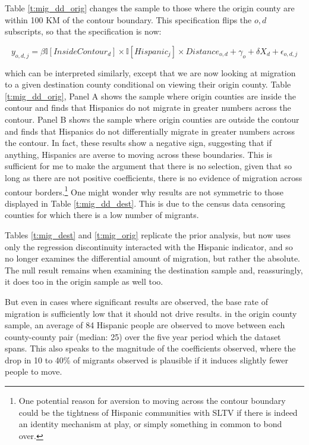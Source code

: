 \documentclass[11pt]{article}
\begin{document}
Table  \ref{t:mig_dd_orig} changes the sample to those where the origin county are within 100 KM of the contour boundary. This specification flips the $o,d$ subscripts, so that the specification is now: 

\[ y_{o,d,j} =  \beta \mathbb{I}[InsideContour_{d}] \times \mathbb{I}[Hispanic_{j}] \times Distance_{o,d} + \gamma_o + \delta  X_d + \epsilon_{o,d,j} \]

which can be interpreted similarly, except that we are now looking at migration to a given destination county conditional on viewing their origin county. Table \ref{t:mig_dd_orig}, Panel A shows the sample where origin counties are inside the contour and finds that Hispanics do not migrate in greater numbers across the contour. Panel B shows the sample where origin counties are outside the contour and finds that Hispanics do not differentially migrate in greater numbers across the contour. In fact, these results show a negative sign, suggesting that if anything, Hispanics are averse to moving across these boundaries. This is sufficient for me to make the argument that there is no selection, given that so long as there are not positive coefficients, there is no evidence of migration across contour borders.\footnote{ One potential reason for aversion to moving across the contour boundary could be the tightness of Hispanic communities with SLTV if there is indeed an identity mechanism at play, or simply something in common to bond over.} One might wonder why results are not symmetric to those displayed in Table \ref{t:mig_dd_dest}. This is due to the census data censoring counties for which there is a low number of migrants. 

Tables \ref{t:mig_dest} and \ref{t:mig_orig} replicate the prior analysis, but now uses only the regression discontinuity interacted with the Hispanic indicator, and so no longer examines the differential amount of migration, but rather the absolute. The null result remains when examining the destination sample and, reassuringly, it does too in the origin sample as well too. 

But even in cases where significant results are observed, the base rate of migration is sufficiently low that it should not drive results. in the origin county sample, an average of 84 Hispanic people are observed to move between each county-county pair (median: 25) over the five year period which the dataset spans. This also speaks to the magnitude of the coefficients observed, where the drop in 10 to 40\% of migrants observed is plausible if it induces slightly fewer people to move. 
\end{document}
